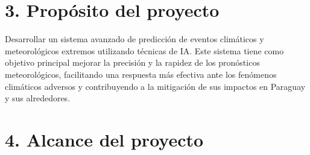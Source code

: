 \documentclass[
11pt, %
codirector, %
]{charter}
\begin{document}
\section{3. Propósito del proyecto}
\label{sec:proposito}

Desarrollar un sistema avanzado de predicción de eventos climáticos y meteorológicos extremos utilizando técnicas de IA. Este sistema tiene como objetivo principal mejorar la precisión y la rapidez de los pronósticos meteorológicos, facilitando una respuesta más efectiva ante los fenómenos climáticos adversos y contribuyendo a la mitigación de sus impactos en Paraguay y sus alrededores.

\section{4. Alcance del proyecto}
\label{sec:alcance}
\end{document}
